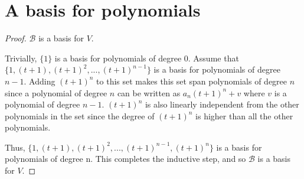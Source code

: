 \section{A basis for polynomials}

\begin{proof}$\mathcal{B}$ is a basis for $V$.\gap

    Trivially, $\{1\}$ is a basis for polynomials of degree 0. 
    Assume that $\{1,(t+1),(t+1)^2,...,(t+1)^{n-1}\}$ is a basis for polynomials of degree $n-1$.
    Adding $(t+1)^n$ to this set makes this set span polynomials of degree $n$ since
    a polynomial of degree $n$ can be written as 
    $a_n(t+1)^n + v$ where $v$ is a polynomial of degree $n-1$.
    $(t+1)^n$ is also linearly independent from the other polynomials in the set
    since the degree of $(t+1)^n$ is higher than all the other polynomials.\gap

    Thus, $\{1,(t+1),(t+1)^2,...,(t+1)^{n-1},(t+1)^n\}$ is a basis for polynomials of degree n.
    This completes the inductive step, and so $\mathcal{B}$ is a basis for $V$.\gap
\end{proof}



